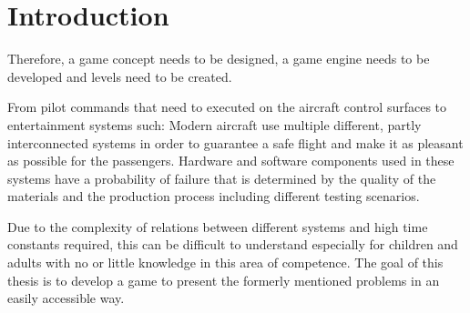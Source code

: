
\chapter{Introduction}\label{ch:introduction}


Therefore, a game concept needs to be designed, a game engine needs to be developed and levels need to be created.

From pilot commands that need to executed on the aircraft control surfaces to entertainment systems such:
Modern aircraft use multiple different, partly interconnected systems in order to guarantee a safe flight and make it
as pleasant as possible for the passengers.
Hardware and software components used in these systems have a probability of failure that is determined by the quality of the materials
and the production process including different testing scenarios. 

Due to the complexity of relations between different systems and high time constants required, this can be difficult
to understand especially for children and adults with no or little knowledge in this area of competence.
The goal of this thesis is to develop a game to present the formerly mentioned problems in an easily
accessible way.

